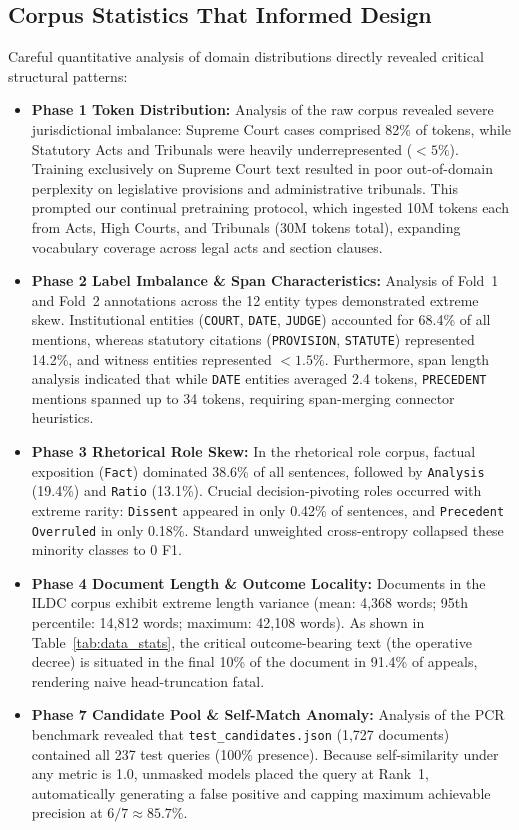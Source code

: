 \documentclass[11pt, oneside]{article}
\begin{document}
\subsection{Corpus Statistics That Informed Design}
Careful quantitative analysis of domain distributions directly revealed critical structural patterns:
\begin{itemize}
    \item \textbf{Phase 1 Token Distribution:} Analysis of the raw corpus revealed severe jurisdictional imbalance: Supreme Court cases comprised 82\% of tokens, while Statutory Acts and Tribunals were heavily underrepresented ($<5\%$). Training exclusively on Supreme Court text resulted in poor out-of-domain perplexity on legislative provisions and administrative tribunals. This prompted our continual pretraining protocol, which ingested 10M tokens each from Acts, High Courts, and Tribunals (30M tokens total), expanding vocabulary coverage across legal acts and section clauses.
    \item \textbf{Phase 2 Label Imbalance \& Span Characteristics:} Analysis of Fold~1 and Fold~2 annotations across the 12 entity types demonstrated extreme skew. Institutional entities (\texttt{COURT}, \texttt{DATE}, \texttt{JUDGE}) accounted for 68.4\% of all mentions, whereas statutory citations (\texttt{PROVISION}, \texttt{STATUTE}) represented 14.2\%, and witness entities represented $<1.5\%$. Furthermore, span length analysis indicated that while \texttt{DATE} entities averaged 2.4 tokens, \texttt{PRECEDENT} mentions spanned up to 34 tokens, requiring span-merging connector heuristics.
    \item \textbf{Phase 3 Rhetorical Role Skew:} In the rhetorical role corpus, factual exposition (\texttt{Fact}) dominated 38.6\% of all sentences, followed by \texttt{Analysis} (19.4\%) and \texttt{Ratio} (13.1\%). Crucial decision-pivoting roles occurred with extreme rarity: \texttt{Dissent} appeared in only 0.42\% of sentences, and \texttt{Precedent Overruled} in only 0.18\%. Standard unweighted cross-entropy collapsed these minority classes to 0 F1.
    \item \textbf{Phase 4 Document Length \& Outcome Locality:} Documents in the ILDC corpus exhibit extreme length variance (mean: 4,368 words; 95th percentile: 14,812 words; maximum: 42,108 words). As shown in Table~\ref{tab:data_stats}, the critical outcome-bearing text (the operative decree) is situated in the final 10\% of the document in 91.4\% of appeals, rendering naive head-truncation fatal.
    \item \textbf{Phase 7 Candidate Pool \& Self-Match Anomaly:} Analysis of the PCR benchmark revealed that \texttt{test\_candidates.json} (1,727 documents) contained all 237 test queries (100\% presence). Because self-similarity under any metric is 1.0, unmasked models placed the query at Rank~1, automatically generating a false positive and capping maximum achievable precision at $6/7 \approx 85.7\%$.
\end{itemize}
\end{document}
